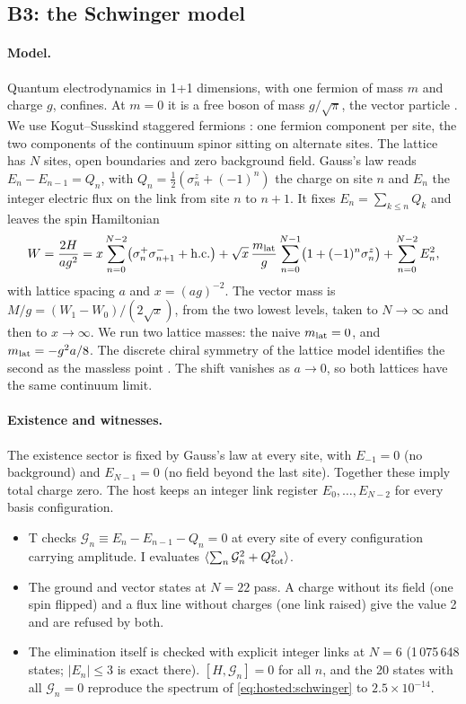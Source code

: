 \subsection{B3: the Schwinger model}\label{app:hosted:b3}

\paragraph{Model.} Quantum electrodynamics in 1+1 dimensions, with one fermion of mass $m$ and charge $g$, confines. At $m=0$ it is a free
boson of mass $g/\sqrt\pi$, the vector particle \cite{schwinger1962}. We use Kogut--Susskind staggered fermions \cite{kogut1975}: one
fermion component per site, the two components of the continuum spinor sitting on alternate sites. The lattice has $N$ sites, open
boundaries and zero background field. Gauss's law reads $E_n-E_{n-1}=Q_n$, with $Q_n=\tfrac12(\sigma^z_n+(-1)^n)$ the charge on site $n$ and
$E_n$ the integer electric flux on the link from site $n$ to $n+1$. It fixes $E_n=\sum_{k\le n}Q_k$ and leaves the spin Hamiltonian
\cite[Eq.~2.6]{banuls2013}
\begin{equation}\label{eq:hosted:schwinger}
W=\frac{2H}{ag^2}=x\sum_{n=0}^{N-2}\bigl(\sigma^+_n\sigma^-_{n+1}+{\rm h.c.}\bigr)+\sqrt x\,\frac{m_{\rm lat}}g\sum_{n=0}^{N-1}\bigl(1+(-1)^n
\sigma^z_n\bigr)+\sum_{n=0}^{N-2}E_n^2,
\end{equation}
with lattice spacing $a$ and $x=(ag)^{-2}$. The vector mass is $M/g=(W_1-W_0)/(2\sqrt x)$, from the two lowest levels, taken to
$N\to\infty$ and then to $x\to\infty$. We run two lattice masses: the naive $m_{\rm lat}=0$, and $m_{\rm lat}=-g^2a/8$. The discrete chiral
symmetry of the lattice model identifies the second as the massless point \cite{dempsey2022}. The shift vanishes as $a\to0$, so both
lattices have the same continuum limit.

\paragraph{Existence and witnesses.} The existence sector is fixed by Gauss's law at every site, with $E_{-1}=0$ (no background) and
$E_{N-1}=0$ (no field beyond the last site). Together these imply total charge zero. The host keeps an integer link register
$E_0,\dots,E_{N-2}$ for every basis configuration.
\begin{itemize}[nosep]
\item T checks $\mathcal G_n\equiv E_n-E_{n-1}-Q_n=0$ at every site of every configuration carrying amplitude. I evaluates
$\langle\sum_n\mathcal G_n^2+Q_{\rm tot}^2\rangle$.
\item The ground and vector states at $N=22$ pass. A charge without its field (one spin flipped) and a flux line without charges (one
link raised) give the value 2 and are refused by both.
\item The elimination itself is checked with explicit integer links at $N=6$ (1\,075\,648 states; $\vert E_n\vert\le3$ is exact there).
$[H,\mathcal G_n]=0$ for all $n$, and the 20 states with all $\mathcal G_n=0$ reproduce the spectrum of \eqref{eq:hosted:schwinger} to
$2.5\times10^{-14}$.
\end{itemize}

